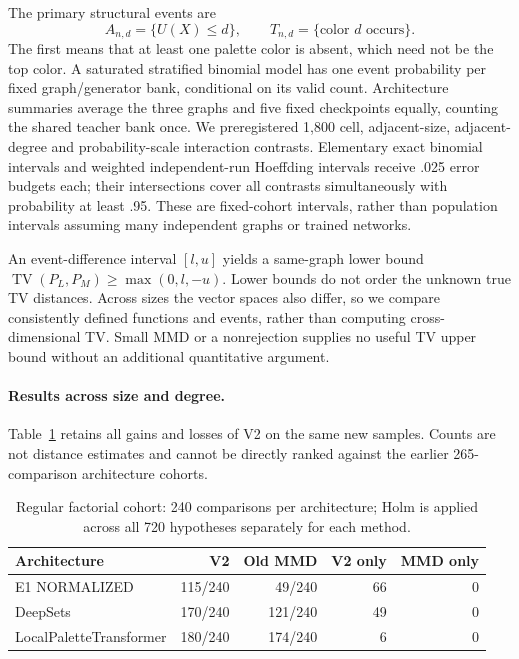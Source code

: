 The primary structural events are
\[
 A_{n,d}=\{U(X)\le d\},\qquad
 T_{n,d}=\{\text{color }d\text{ occurs}\}.
\]
The first means that at least one palette color is absent, which need not be
the top color. A saturated stratified binomial model has one event probability
per fixed graph/generator bank, conditional on its valid count. Architecture
summaries average the three graphs and five fixed checkpoints equally, counting
the shared teacher bank once. We preregistered 1,800 cell, adjacent-size,
adjacent-degree and probability-scale interaction contrasts. Elementary exact
binomial intervals and weighted independent-run Hoeffding intervals receive
.025 error budgets each; their intersections cover all contrasts simultaneously
with probability at least .95. These are fixed-cohort intervals, rather than
population intervals assuming many independent graphs or trained networks.

An event-difference interval $[l,u]$ yields a same-graph lower bound
$\operatorname{TV}(P_L,P_M)\ge\max(0,l,-u)$. Lower bounds do not order the
unknown true TV distances. Across sizes the vector spaces also differ, so
we compare consistently defined functions and events, rather than computing
cross-dimensional TV. Small MMD or a nonrejection supplies no useful TV upper
bound without an additional quantitative argument.

\paragraph{Results across size and degree.}
Table~\ref{tab:factorial-tests} retains all gains and losses of V2 on the
same new samples. Counts are not distance estimates and cannot be directly
ranked against the earlier 265-comparison architecture cohorts.
\begin{table}[t]
\centering\small
\begin{tabular}{lrrrr}
\toprule Architecture & V2 & Old MMD & V2 only & MMD only\\
\midrule
E1 NORMALIZED & 115/240 & 49/240 & 66 & 0 \\
DeepSets & 170/240 & 121/240 & 49 & 0 \\
LocalPaletteTransformer & 180/240 & 174/240 & 6 & 0 \\
\bottomrule
\end{tabular}
\caption{Regular factorial cohort: 240 comparisons per architecture;
Holm is applied across all 720 hypotheses separately for each method.}
\label{tab:factorial-tests}
\end{table}

